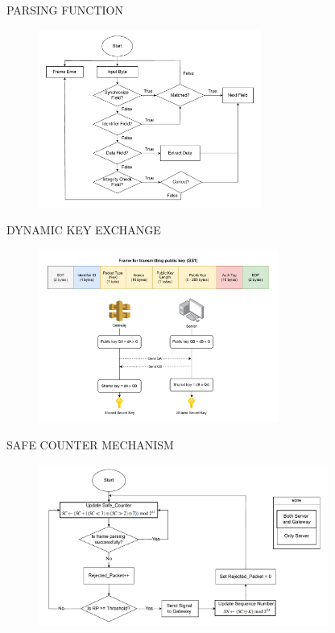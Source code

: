 \begin{frame}{PARSING FUNCTION}
\vspace{-0.3cm}
    \begin{figure}
    	\centering
    	\includegraphics[width=0.65\textwidth]{pic/frameparse.pdf}
    \end{figure}
\end{frame}

\begin{frame}{DYNAMIC KEY EXCHANGE}
    \vspace{-0.3cm}
    \begin{figure}
    	\centering
    	\includegraphics[width=0.7\textwidth]{pic/ecdh.pdf}
    \end{figure}
\end{frame}

\begin{frame}{SAFE COUNTER MECHANISM}
\vspace{-0.3cm}
    \begin{figure}
    	\centering
    	\includegraphics[width=0.85\textwidth]{pic/sc.pdf}
    \end{figure}
\end{frame}